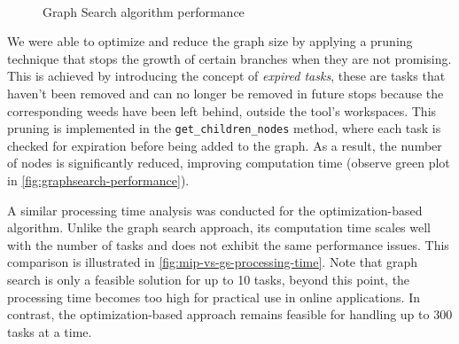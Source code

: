 \begin{figure}[htb]
    \myfloatalign
     \quad
     \\
    \caption{Graph Search algorithm performance}\label{fig:graphsearch-performance}
\end{figure}

We were able to optimize and reduce the graph size by applying a pruning technique that stops the growth of certain branches when they are not promising. This is achieved by introducing the concept of \textit{expired tasks}, these are tasks that haven't been removed and can no longer be removed in future stops because the corresponding weeds have been left behind, outside the tool's workspaces. This pruning is implemented in the \texttt{get\_children\_nodes} method, where each task is checked for expiration before being added to the graph. As a result, the number of nodes is significantly reduced, improving computation time (observe green plot in \autoref{fig:graphsearch-performance}).

A similar processing time analysis was conducted for the optimization-based algorithm. Unlike the graph search approach, its computation time scales well with the number of tasks and does not exhibit the same performance issues. This comparison is illustrated in \autoref{fig:mip-vs-gs-processing-time}. Note that graph search is only a feasible solution for up to 10 tasks, beyond this point, the processing time becomes too high for practical use in online applications. In contrast, the optimization-based approach remains feasible for handling up to 300 tasks at a time.

